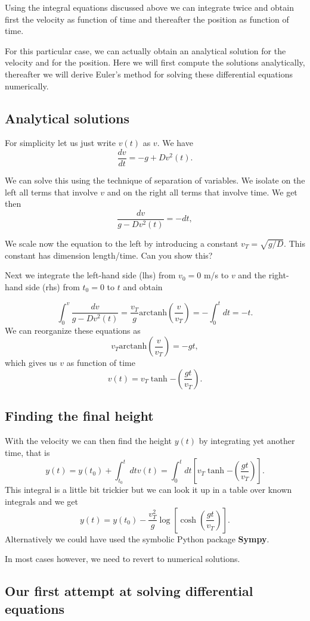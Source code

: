\documentclass[%
oneside,                 %
final,                   %
10pt]{article}
\begin{document}
Using the integral equations discussed above we can integrate twice
and obtain first the velocity as function of time and thereafter the
position as function of time.

For this particular case, we can actually obtain an analytical
solution for the velocity and for the position. Here we will first
compute the solutions analytically, thereafter we will derive Euler's
method for solving these differential equations numerically.

\subsection*{Analytical solutions}

For simplicity let us just write $v(t)$ as $v$. We have
\[
\frac{dv}{dt}= -g +Dv^2(t). 
\]

We can solve this using the technique of separation of variables. We
isolate on the left all terms that involve $v$ and on the right all
terms that involve time. We get then
\[
\frac{dv}{g -Dv^2(t) }= -dt,
\]

We scale now the equation to the left by introducing a constant
$v_T=\sqrt{g/D}$. This constant has dimension length/time. Can you
show this?

Next we integrate the left-hand side (lhs) from $v_0=0$ m/s to $v$ and
the right-hand side (rhs) from $t_0=0$ to $t$ and obtain

\[
\int_{0}^v\frac{dv}{g -Dv^2(t) }= \frac{v_T}{g}\mathrm{arctanh}(\frac{v}{v_T})  =-\int_0^tdt = -t. 
\]
We can reorganize these equations as
\[
v_T\mathrm{arctanh}(\frac{v}{v_T})  =-gt,
\]
which gives us $v$ as function of time
\[
v(t)=v_T\tanh{-(\frac{gt}{v_T})}.
\]

\subsection*{Finding the final height}
With the velocity we can then find the height $y(t)$ by integrating yet another time, that is
\[
y(t)=y(t_0)+\int_{t_0}^t dt v(t)=\int_{0}^t dt[v_T\tanh{-(\frac{gt}{v_T})}]. 
\]
This integral is a little bit trickier but we can look it up in a table over 
known integrals and we get
\[
y(t)=y(t_0)-\frac{v_T^2}{g}\log{[\cosh{(\frac{gt}{v_T})}]}.
\]
Alternatively we could have used the symbolic Python package \textbf{Sympy}.

In most cases however, we need to revert to numerical solutions. 

\subsection*{Our first attempt at solving differential equations}
\end{document}
